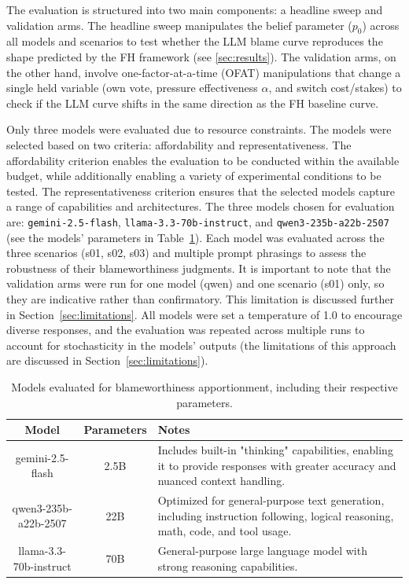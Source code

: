 \documentclass{article}
\begin{document}
The evaluation is structured into two main components: a headline sweep and validation arms. The headline sweep manipulates the belief parameter ($p_0$) across all models and scenarios to test whether the LLM blame curve reproduces the shape predicted by the FH framework (see \ref{sec:results}). The validation arms, on the other hand, involve one-factor-at-a-time (OFAT) manipulations that change a single held variable (own vote, pressure effectiveness $\alpha$, and switch cost/stakes) to check if the LLM curve shifts in the same direction as the FH baseline curve.

Only three models were evaluated due to resource constraints. The models were selected based on two criteria: affordability and representativeness. The affordability criterion enables the evaluation to be conducted within the available budget, while additionally enabling a variety of experimental conditions to be tested. The representativeness criterion ensures that the selected models capture a range of capabilities and architectures. The three models chosen for evaluation are: \texttt{gemini-2.5-flash}, \texttt{llama-3.3-70b-instruct}, and \texttt{qwen3-235b-a22b-2507} (see the models' parameters in Table~\ref{tab:models}). Each model was evaluated across the three scenarios (s01, s02, s03) and multiple prompt phrasings to assess the robustness of their blameworthiness judgments. It is important to note that the validation arms were run for one model (qwen) and one scenario (s01) only, so they are indicative rather than confirmatory. This limitation is discussed further in Section~\ref{sec:limitations}. All models were set a temperature of 1.0 to encourage diverse responses, and the evaluation was repeated across multiple runs to account for stochasticity in the models' outputs (the limitations of this approach are discussed in Section~\ref{sec:limitations}).

\begin{table}[h]
  \centering
  \caption{Models evaluated for blameworthiness apportionment, including their respective parameters.}
  \begin{tabular}{|c|c|p{6cm}|}
    \hline
    Model & Parameters & Notes \\
    \hline
    gemini-2.5-flash & 2.5B &  Includes built-in "thinking" capabilities, enabling it to provide responses with greater accuracy and nuanced context handling. \\[5pt]
    qwen3-235b-a22b-2507 & 22B & Optimized for general-purpose text generation, including instruction following, logical reasoning, math, code, and tool usage. \\[5pt]
    llama-3.3-70b-instruct & 70B & General-purpose large language model with strong reasoning capabilities. \\[5pt]
    \hline
  \end{tabular}
  \label{tab:models}
\end{table}
\end{document}
